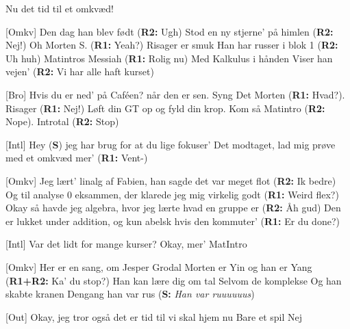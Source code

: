 \documentclass[a4paper,11pt]{article}
\begin{document}
\begin{song}
     Nu det tid til et omkvæd!

    [Omkv] Den dag han blev født (\textbf{R2:} Ugh)
                Stod en ny stjerne' på himlen (\textbf{R2:} Nej!)
                Oh Morten S. (\textbf{R1:} Yeah?)
                Risager er smuk
                Han har russer i blok 1 (\textbf{R2:} Uh huh)
                Matintros Messiah (\textbf{R1:} Rolig nu)
                Med Kalkulus i hånden
                Viser han vejen' (\textbf{R2:} Vi har alle haft kurset)           

    [Bro] Hvis du er ned' på Caféen? når den er sen. Syng
     Det Morten (\textbf{R1:} Hvad?). Risager (\textbf{R1:} Nej!)
     Løft din GT op og fyld din krop. Kom så
     Matintro (\textbf{R2:} Nope). Introtal (\textbf{R2:} Stop)

    [Intl] Hey (\textbf{S}) jeg har brug for at du lige fokuser'
     Det modtaget, lad mig prøve med et omkvæd mer' (\textbf{R1:} Vent-)

    [Omkv] Jeg lært' linalg af Fabien, han sagde det var meget flot 
            (\textbf{R2:} Ik bedre)
            Og til analyse 0 eksammen, der klarede jeg mig virkelig godt 
            (\textbf{R1:} Weird flex?)
            Okay så havde jeg algebra, hvor jeg lærte hvad en gruppe er 
            (\textbf{R2:} Åh gud)
            Den er lukket under addition, og kun abelsk hvis den kommuter'
            (\textbf{R1:} Er du done?)
            
    [Intl] Var det lidt for mange kurser? Okay, mer' MatIntro

    [Omkv] Her er en sang, om Jesper Grodal
            Morten er Yin og han er Yang (\textbf{R1+R2:} Ka' du stop?)
            Han kan lære dig om tal
            Selvom de komplekse
            Og han skabte kranen
            Dengang han var rus (\textbf{S:} \textit{Han var ruuuuuus})

    [Out] Okay, jeg tror også det er tid til vi skal hjem nu
     Bare et spil
     Nej
    
\end{song}
\end{document}
